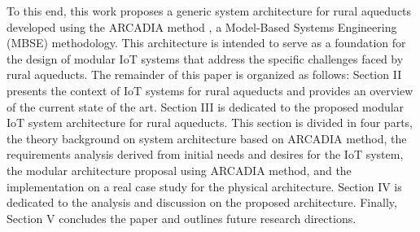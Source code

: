\documentclass[conference]{IEEEtran}
\begin{document}
To this end, this work proposes a generic system architecture for rural aqueducts developed using the ARCADIA method \cite{arcadia}, a Model-Based Systems Engineering (MBSE) methodology. This architecture is intended to serve as a foundation for the design of modular IoT systems that address the specific challenges faced by rural aqueducts. The remainder of this paper is organized as follows: Section II presents the context of IoT systems for rural aqueducts and provides an overview of the current state of the art. Section III is dedicated to the proposed modular IoT system architecture for rural aqueducts. This section is divided in four parts, the theory background on system architecture based on ARCADIA method, the requirements analysis derived from initial needs and desires for the IoT system, the modular architecture proposal using ARCADIA method, and the implementation on a real case study for the physical architecture. Section IV is dedicated to the analysis and discussion on the proposed architecture. Finally, Section V concludes the paper and outlines future research directions.   



\end{document}
